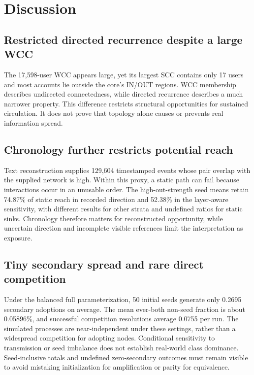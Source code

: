 \documentclass[11pt,a4paper]{article}
\begin{document}
\section{Discussion}
\subsection{Restricted directed recurrence despite a large WCC}
The 17,598-user WCC appears large, yet its largest SCC contains only 17 users and most accounts lie outside the core's IN/OUT regions. WCC membership describes undirected connectedness, while directed recurrence describes a much narrower property. This difference restricts structural opportunities for sustained circulation. It does not prove that topology alone causes or prevents real information spread.

\subsection{Chronology further restricts potential reach}
Text reconstruction supplies 129,604 timestamped events whose pair overlap with the supplied network is high. Within this proxy, a static path can fail because interactions occur in an unusable order. The high-out-strength seed means retain 74.87\% of static reach in recorded direction and 52.38\% in the layer-aware sensitivity, with different results for other strata and undefined ratios for static sinks. Chronology therefore matters for reconstructed opportunity, while uncertain direction and incomplete visible references limit the interpretation as exposure.

\subsection{Tiny secondary spread and rare direct competition}
Under the balanced full parameterization, 50 initial seeds generate only 0.2695 secondary adoptions on average. The mean ever-both non-seed fraction is about 0.05896\%, and successful competition resolutions average 0.0755 per run. The simulated processes are near-independent under these settings, rather than a widespread competition for adopting nodes. Conditional sensitivity to transmission or seed imbalance does not establish real-world class dominance. Seed-inclusive totals and undefined zero-secondary outcomes must remain visible to avoid mistaking initialization for amplification or parity for equivalence.
\end{document}
